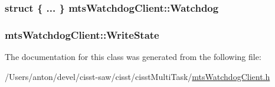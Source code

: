 \subsubsection[{Watchdog}]{\setlength{\rightskip}{0pt plus 5cm}struct \{ ... \}   mts\+Watchdog\+Client\+::\+Watchdog\hspace{0.3cm}{\ttfamily [protected]}}\label{classmts_watchdog_client_af55c113ae1a80c6840a9617a8ef21f3b}
\hypertarget{classmts_watchdog_client_a2ea664a49adbdd5667624efef40044f8}{}
\subsubsection[{Write\+State}]{ mts\+Watchdog\+Client\+::\+Write\+State}\label{classmts_watchdog_client_a2ea664a49adbdd5667624efef40044f8}


The documentation for this class was generated from the following file\+:\begin{DoxyCompactItemize}
\item 
/\+Users/anton/devel/cisst-\/saw/cisst/cisst\+Multi\+Task/\hyperlink{mts_watchdog_client_8h}{mts\+Watchdog\+Client.\+h}\end{DoxyCompactItemize}
